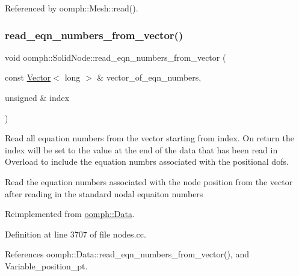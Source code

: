 Referenced by oomph\+::\+Mesh\+::read().

\mbox{\label{classoomph_1_1SolidNode_a38bede9e51c7d6355969db2bc075f476}} 
\subsubsection{\texorpdfstring{read\+\_\+eqn\+\_\+numbers\+\_\+from\+\_\+vector()}{read\_eqn\_numbers\_from\_vector()}}
{\footnotesize\ttfamily void oomph\+::\+Solid\+Node\+::read\+\_\+eqn\+\_\+numbers\+\_\+from\+\_\+vector (\begin{DoxyParamCaption}\item[{const \hyperlink{classoomph_1_1Vector}{Vector}$<$ long $>$ \&}]{vector\+\_\+of\+\_\+eqn\+\_\+numbers,  }\item[{unsigned \&}]{index }\end{DoxyParamCaption})\hspace{0.3cm}{\ttfamily [virtual]}}



Read all equation numbers from the vector starting from index. On return the index will be set to the value at the end of the data that has been read in Overload to include the equation numbrs associated with the positional dofs. 

Read the equation numbers associated with the node position from the vector after reading in the standard nodal equaiton numbers 

Reimplemented from \hyperlink{classoomph_1_1Data_ae958e52df6ede2a08f957db4ee685ca7}{oomph\+::\+Data}.



Definition at line 3707 of file nodes.\+cc.



References oomph\+::\+Data\+::read\+\_\+eqn\+\_\+numbers\+\_\+from\+\_\+vector(), and Variable\+\_\+position\+\_\+pt.

\mbox{\label{classoomph_1_1SolidNode_a8884dfe9e2808883e90c7f2822151784}} 
